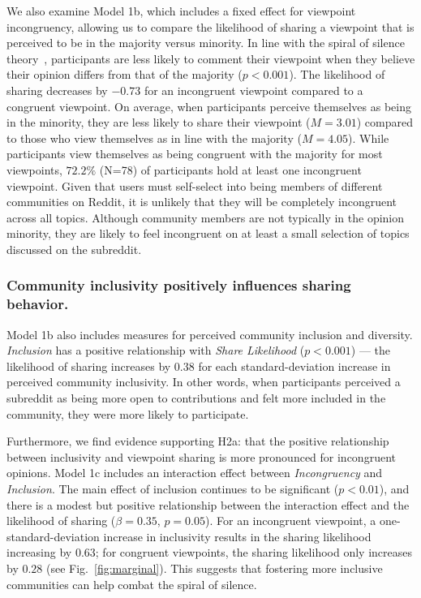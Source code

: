 We also examine Model 1b, which includes a fixed effect for viewpoint incongruency, allowing us to compare the likelihood of sharing a viewpoint that is perceived to be in the majority versus minority. In line with the spiral of silence theory~\cite{noelle1974spiral}, participants are less likely to comment their viewpoint when they believe their opinion differs from that of the majority ($p<0.001$). The likelihood of sharing decreases by $-0.73$ for an incongruent viewpoint compared to a congruent viewpoint. On average, when participants perceive themselves as being in the minority, they are less likely to share their viewpoint ($M = 3.01$) compared to those who view themselves as in line with the majority ($M = 4.05$). 
While participants view themselves as being congruent with the majority for most viewpoints, $72.2\%$ (N=78) of participants hold at least one incongruent viewpoint. Given that users must self-select into being members of different communities on Reddit, it is unlikely that they will be completely incongruent across all topics. Although community members are not typically in the opinion minority, they are likely to feel incongruent on at least a small selection of topics discussed on the subreddit. 



\subsubsection{Community inclusivity positively influences sharing behavior.}
Model 1b also includes measures for perceived community inclusion and diversity. \textit{Inclusion} has a positive relationship with \textit{Share Likelihood} ($p<0.001$) --- the likelihood of sharing increases by $0.38$ for each standard-deviation increase in perceived community inclusivity. In other words, when participants perceived a subreddit as being more open to contributions and felt more included in the community, they were more likely to participate. 

Furthermore, we find evidence supporting H2a: that the positive relationship between inclusivity and viewpoint sharing is more pronounced for incongruent opinions. Model 1c includes an interaction effect between \textit{Incongruency} and \textit{Inclusion}. The main effect of inclusion continues to be significant ($p<0.01$), and there is a modest but positive relationship between the interaction effect and the likelihood of sharing ($\beta=0.35$, $p=0.05$). For an incongruent viewpoint, a one-standard-deviation increase in inclusivity results in the sharing likelihood increasing by $0.63$; for congruent viewpoints, the sharing likelihood only increases by $0.28$ (see Fig.~\ref{fig:marginal}). This suggests that fostering more inclusive communities can help combat the spiral of silence.

